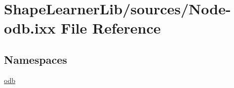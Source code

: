 \hypertarget{_node-odb_8ixx}{}\section{Shape\+Learner\+Lib/sources/\+Node-\/odb.ixx File Reference}
\label{_node-odb_8ixx}
\subsection*{Namespaces}
\begin{DoxyCompactItemize}
\item 
 \hyperlink{namespaceodb}{odb}
\end{DoxyCompactItemize}
